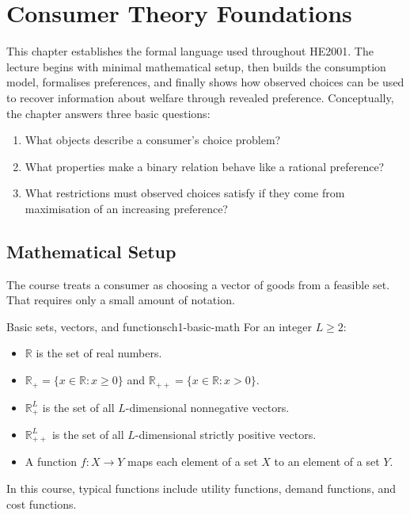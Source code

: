 \section{Consumer Theory Foundations}

This chapter establishes the formal language used throughout \textsc{HE2001}. The lecture begins with minimal mathematical setup, then builds the consumption model, formalises preferences, and finally shows how observed choices can be used to recover information about welfare through revealed preference. Conceptually, the chapter answers three basic questions:
\begin{enumerate}
    \item What objects describe a consumer's choice problem?
    \item What properties make a binary relation behave like a rational preference?
    \item What restrictions must observed choices satisfy if they come from maximisation of an increasing preference?
\end{enumerate}

\subsection{Mathematical Setup}

The course treats a consumer as choosing a vector of goods from a feasible set. That requires only a small amount of notation.

\begin{definition}{Basic sets, vectors, and functions}{ch1-basic-math}
For an integer $L \ge 2$:
\begin{itemize}
    \item $\mathbb{R}$ is the set of real numbers.
    \item $\mathbb{R}_+ = \{x \in \mathbb{R} : x \ge 0\}$ and $\mathbb{R}_{++} = \{x \in \mathbb{R} : x > 0\}$.
    \item $\mathbb{R}^L_+$ is the set of all $L$-dimensional nonnegative vectors.
    \item $\mathbb{R}^L_{++}$ is the set of all $L$-dimensional strictly positive vectors.
    \item A function $f : X \to Y$ maps each element of a set $X$ to an element of a set $Y$.
\end{itemize}
In this course, typical functions include utility functions, demand functions, and cost functions.
\end{definition}

